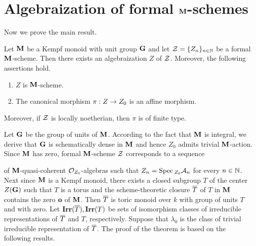 \section{Algebraization of formal $\mathbf{M}$-schemes}
\noindent
Now we prove the main result.

\begin{theorem}\label{theorem:algebraization}
Let $\mathbf{M}$ be a Kempf monoid with unit group $\mathbf{G}$ and let ${\mathcal Z} = \{Z_n\}_{n\in {\mathbb N}}$ be a formal $\mathbf{M}$-scheme. Then there exists an algebraization $Z$ of ${\mathcal Z}$.
Moreover, the following assertions hold.
\begin{enumerate}[label=\emph{\textbf{(\arabic*)}}, leftmargin=1.5em]
\item $Z$ is $\mathbf{M}$-scheme.
\item The canonical morphism $\pi:Z\rightarrow Z_0$ is an affine morphism.
\end{enumerate}
Moreover, if ${\mathcal Z}$ is locally noetherian, then $\pi$ is of finite type.
\end{theorem}
\noindent
Let $\mathbf{G}$ be the group of units of $\mathbf{M}$. According to the fact that $\mathbf{M}$ is integral, we derive that $\mathbf{G}$ is schematically dense in $\mathbf{M}$ and hence $Z_0$ admits trivial $\mathbf{M}$-action. Since $\mathbf{M}$ has zero, formal $\mathbf{M}$-scheme ${\mathcal Z}$ corresponds to a sequence
\begin{center}
\end{center}
of $\mathbf{M}$-quasi-coherent ${\mathcal O}_{Z_0}$-algebras such that $Z_n = \mathrm{Spec}\,_{Z_0}{\mathcal A}_n$ for every $n\in {\mathbb N}$. Next since $\mathbf{M}$ is a Kempf monoid, there exists a closed subgroup $T$ of the center $Z(\mathbf{G})$ such that $T$ is a torus and the scheme-theoretic closure $\overline{T}$ of $T$ in $\mathbf{M}$ contains the zero $\mathbf{o}$ of $\mathbf{M}$. Then $\overline{T}$ is toric monoid over $k$ with group of units $T$ and with zero. Let $\mathbf{Irr}(\overline{T}), \mathbf{Irr}(T)$ be sets of isomorphism classes of irreducible representations of $\overline{T}$ and $T$, respectively. Suppose that $\lambda_0$ is the class of trivial irreducible representation of $\overline{T}$. The proof of the theorem is based on the following results.

